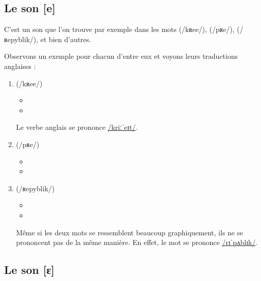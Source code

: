 \subsection{Le son [e]}\label{subsec:efr}

C'est un son que l'on trouve par exemple dans les mots 
(/kʀee/),  (/pʀe/),  (/ʀepyblik/), et bien d'autres.

Observons un exemple pour chacun d'entre eux et voyons leurs
traductions anglaises :\par

\begin{enumerate}
\item {} (/kʀee/)
  \begin{itemize}
  \item {}
    \item {}
    \end{itemize}
    Le verbe anglais  se prononce
    \href{https://en.oxforddictionaries.com/definition/create}{/kriːˈeɪt/}.
\item {} (/pʀe/)
  \begin{itemize}
  \item {}
  \item {}
  \end{itemize}
  

\item {} (/ʀepyblik/)
  \begin{itemize}
  \item {}
  \item {}
  \end{itemize}
  Même si les deux mots se ressemblent beaucoup graphiquement, ils
  ne se prononcent pas de la même manière. En effet, le mot
   se prononce \href{https://en.oxforddictionaries.com/definition/republic}{/rɪˈpʌblɪk/}. 
\end{enumerate}

  
\subsection{Le son [ɛ]}\label{subsec:ɛfr}

